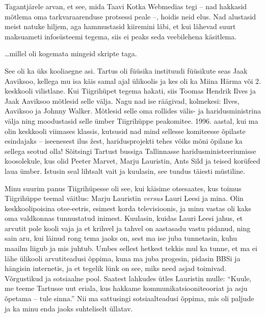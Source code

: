 Tagantjärele arvan, et see, mida Taavi Kotka 
Webmedias tegi -- nad hakkasid 
mõtlema oma tarkvaraarenduse protsessi peale --, hoidis neid elus. 
Nad alustasid meist natuke hiljem, aga hammustasid kiiremini läbi, et kui 
lähevad suurt maksuameti infosüsteemi tegema, siis ei peaks seda veebilehena 
käsitlema. 


\ldots millel oli kogemata mingeid skripte taga.


See oli ka üks kooliaegne asi. Tartus oli füüsika 
instituudi füüsikute seas Jaak 
Aaviksoo, kellega mu isa käis samal ajal 
ülikoolis ja kes oli ka Miina Härma või 
2. keskkooli vilistlane. Kui Tiigrihüpet tegema hakati, siis Toomas Hendrik 
Ilves ja Jaak Aaviksoo mõtlesid selle välja. Nagu nad ise räägivad, kolmekesi: Ilves, Aaviksoo 
ja Johnny Walker. Mõtlesid selle oma rollides välis- ja 
haridusministrina välja ning moodustasid selle ümber Tiigrihüppe peakomitee. 
1996. aastal, kui ma olin keskkooli viimases klassis, kutsusid nad mind sellesse 
komiteesse õpilaste esindajaks -- iseenesest ilus žest, 
haridusprojekti tehes võiks mõni õpilane ka sellega seotud olla! Sõitsingi Tartust bussiga Tallinnasse haridusministeeriumisse 
koosolekule, kus olid Peeter Marvet, Marju 
Lauristin, Ants Sild ja 
teised korüfeed laua ümber. Istusin seal 
lihtsalt vait ja kuulasin, see tundus täiesti müstiline. 

Minu suurim panus Tiigrihüpesse oli see, kui käisime otsesaates, kus toimus Tiigrihüppe 
teemal väitlus: Marju Lauristin \emph{versus} 
Lauri Leesi ja mina. Olin keskkoolipoisina otse-eetris, esimest korda 
televisioonis, ja minu vastas oli kaks oma 
valdkonnas tunnustatud inimest. Kuulasin, kuidas Lauri Leesi 
jahus, et arvutit pole kooli vaja ja et krihvel ja tahvel 
on aastasadu vastu pidanud, ning sain aru, kui läinud rong tema
jaoks on, sest ma ise juba tunnetasin, kuhu maailm liigub ja mis juhtub. Umbes sellest hetkest tekkis mul ka tunne, 
et ma ei lähe ülikooli arvutiteadusi õppima, kuna ma juba progesin, pidasin
BBSi ja hängisin internetis, ja et tegelik lünk on see, miks need 
asjad toimivad. Võrgustikud ja sotsiaalne pool. Saatest lahkudes ütles Lauristin mulle: \enquote{Kuule, me teeme 
Tartusse uut eriala, kus hakkame kommunikatsiooniteooriat ja asju õpetama -- 
tule sinna.} Nii ma sattusingi sotsiaalteadusi õppima, mis 
oli paljude ja ka minu enda jaoks suhteliselt üllatav.

